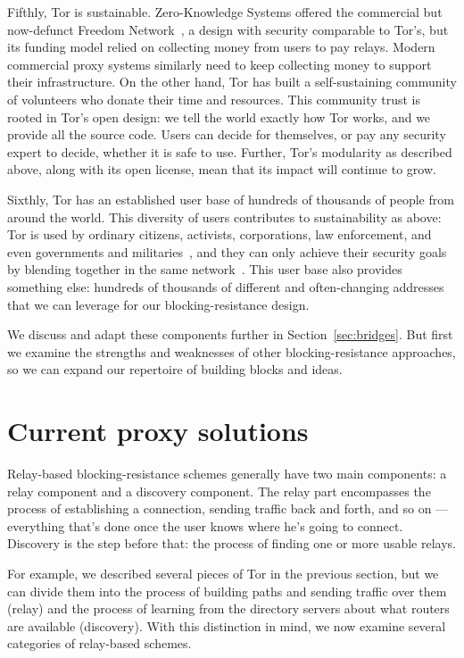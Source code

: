 \documentclass{llncs}
\begin{document}
Fifthly, Tor is sustainable. Zero-Knowledge Systems offered the commercial
but now-defunct Freedom Network~\cite{freedom21-security}, a design with
security comparable to Tor's, but its funding model relied on collecting
money from users to pay relays. Modern commercial proxy systems similarly
need to keep collecting money to support their infrastructure. On the
other hand, Tor has built a self-sustaining community of volunteers who
donate their time and resources. This community trust is rooted in Tor's
open design: we tell the world exactly how Tor works, and we provide all
the source code. Users can decide for themselves, or pay any security
expert to decide, whether it is safe to use. Further, Tor's modularity
as described above, along with its open license, mean that its impact
will continue to grow.

Sixthly, Tor has an established user base of hundreds of
thousands of people from around the world. This diversity of
users contributes to sustainability as above: Tor is used by
ordinary citizens, activists, corporations, law enforcement, and
even governments and militaries~\cite{tor-use-cases}, and they can
only achieve their security goals by blending together in the same
network~\cite{econymics,usability:weis2006}. This user base also provides
something else: hundreds of thousands of different and often-changing
addresses that we can leverage for our blocking-resistance design.

We discuss and adapt these components further in
Section~\ref{sec:bridges}. But first we examine the strengths and
weaknesses of other blocking-resistance approaches, so we can expand
our repertoire of building blocks and ideas.

\section{Current proxy solutions}
\label{sec:related}

Relay-based blocking-resistance schemes generally have two main
components: a relay component and a discovery component. The relay part
encompasses the process of establishing a connection, sending traffic
back and forth, and so on --- everything that's done once the user knows
where he's going to connect. Discovery is the step before that: the
process of finding one or more usable relays.

For example, we described several pieces of Tor in the previous section,
but we can divide them into the process of building paths and sending
traffic over them (relay) and the process of learning from the directory
servers about what routers are available (discovery). With this distinction
in mind, we now examine several categories of relay-based schemes.
\end{document}
